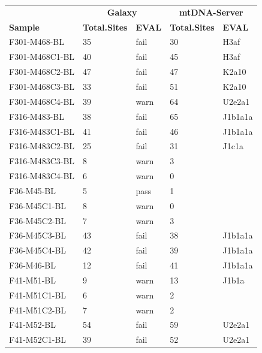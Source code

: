 \begin{itemize}
\begin{table}[]
\label{comptable}
\begin{tabular}{lllll}
     & \multicolumn{2}{c}{\textbf{Galaxy}} & \multicolumn{2}{c}{\textbf{mtDNA-Server}} \\
\textbf{Sample}       & \textbf{Total.Sites}     & \textbf{EVAL}     & \textbf{Total.Sites}        & \textbf{EVAL}        \\
F301-M468-BL &35 &\cellcolor[HTML]{34CDF9} fail &30 &\cellcolor[HTML]{34CDF9}H3af \\
F301-M468C1-BL &40 &\cellcolor[HTML]{34CDF9} fail &45 &\cellcolor[HTML]{34CDF9}H3af \\
F301-M468C2-BL &47 &\cellcolor[HTML]{34CDF9} fail &47 &\cellcolor[HTML]{34CDF9}K2a10 \\
F301-M468C3-BL &33 &\cellcolor[HTML]{34CDF9} fail &51 &\cellcolor[HTML]{34CDF9}K2a10  \\
F301-M468C4-BL &39 &\cellcolor[HTML]{FFCC67}warn &64 &\cellcolor[HTML]{34CDF9}U2e2a1 \\
F316-M483-BL &38 &\cellcolor[HTML]{34CDF9} fail &65 &\cellcolor[HTML]{34CDF9}J1b1a1a \\
F316-M483C1-BL &41 &\cellcolor[HTML]{34CDF9} fail &46 &\cellcolor[HTML]{34CDF9}J1b1a1a \\
F316-M483C2-BL &25 &\cellcolor[HTML]{34CDF9} fail &31 &\cellcolor[HTML]{34CDF9}J1c1a \\
F316-M483C3-BL &8 &warn &3 & \\
F316-M483C4-BL &6 &warn &0 & \\
F36-M45-BL &5 &pass &1 & \\
F36-M45C1-BL &8 &warn &0 & \\
F36-M45C2-BL &7 &warn &3 & \\
F36-M45C3-BL &43 &\cellcolor[HTML]{34CDF9} fail &38 &\cellcolor[HTML]{34CDF9}J1b1a1a \\
F36-M45C4-BL &42 &\cellcolor[HTML]{34CDF9} fail &39 &\cellcolor[HTML]{34CDF9}J1b1a1a \\
F36-M46-BL &12 &\cellcolor[HTML]{34CDF9} fail &41 &\cellcolor[HTML]{34CDF9}J1b1a1a \\
F41-M51-BL &9 &warn &13 &\cellcolor[HTML]{FFCC67}J1b1a \\
F41-M51C1-BL &6 &warn &2 & \\
F41-M51C2-BL &7 &warn &2 & \\
F41-M52-BL &54 &\cellcolor[HTML]{34CDF9} fail &59 &\cellcolor[HTML]{34CDF9}U2e2a1 \\
F41-M52C1-BL &39 &\cellcolor[HTML]{34CDF9} fail &52 &\cellcolor[HTML]{34CDF9}U2e2a1 \\

\end{tabular}
\end{table}
\end{itemize}

